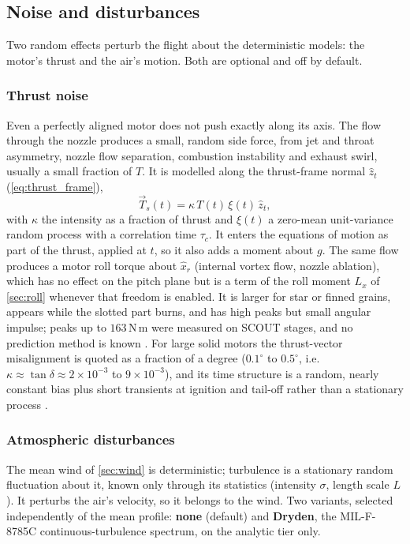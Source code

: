 \subsection{Noise and disturbances}\label{sec:noise}
Two random effects perturb the flight about the deterministic models: the motor's thrust and the
air's motion. Both are optional and off by default.

\subsubsection{Thrust noise}
Even a perfectly aligned motor does not push exactly along its axis. The flow through the nozzle
produces a small, random side force, from jet and throat asymmetry, nozzle flow separation,
combustion instability and exhaust swirl, usually a small fraction of $T$. It is modelled along
the thrust-frame normal $\hat{z}_t$ (\autoref{eq:thrust_frame}),
\begin{equation}
    \vec{T}_s(t)=\kappa\,T(t)\,\xi(t)\,\hat{z}_t,
\end{equation}
with $\kappa$ the intensity as a fraction of thrust and $\xi(t)$ a zero-mean unit-variance random
process with a correlation time $\tau_c$. It enters the equations of motion as part of the thrust,
applied at $t$, so it also adds a moment about $g$. The same flow produces a motor roll torque
about $\hat{x}_r$ (internal vortex flow, nozzle ablation), which has no effect on the pitch plane
but is a term of the roll moment $L_x$ of \autoref{sec:roll} whenever that freedom is enabled.
It is larger for star or finned grains, appears while the slotted part burns, and
has high peaks but small angular impulse; peaks up to $163\,\mathrm{N\,m}$ were measured on SCOUT
stages, and no prediction method is known \cite{knauberroll}.
For large solid motors the thrust-vector misalignment is quoted as a fraction of a degree
($0.1^\circ$ to $0.5^\circ$, i.e.\ $\kappa\approx\tan\delta\approx2\times10^{-3}$ to
$9\times10^{-3}$), and its time structure is a random, nearly constant bias plus short transients
at ignition and tail-off rather than a stationary process \cite{knauber}.

\subsubsection{Atmospheric disturbances}\label{sec:atmos_noise}
The mean wind of \autoref{sec:wind} is deterministic; turbulence is a stationary random
fluctuation about it, known only through its statistics (intensity $\sigma$, length scale $L$).
It perturbs the air's velocity, so it belongs to the wind. Two variants, selected independently of
the mean profile: \textbf{none} (default) and \textbf{Dryden}, the MIL-F-8785C
\cite{milf8785} continuous-turbulence spectrum, on the analytic tier only.


